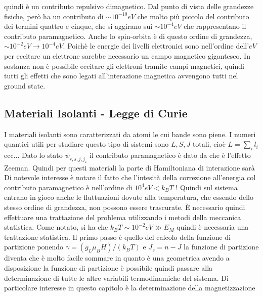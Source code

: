 quindi è un contributo repulsivo dimagnetico. Dal punto di vista delle grandezze fisiche, però ha un contributo di $\sim 10^{-10}eV$ che molto più piccolo del contributo dei termini quattro e cinque, che si aggirano sui $\sim 10^{-4}eV$ che rappresentano il contributo paramagnetico. Anche lo spin-orbita è di questo ordine di grandezza, $\sim 10^{-2}eV \to 10^{-4}eV$.
Poichè le energie dei livelli elettronici sono nell'ordine dell'$eV$ per eccitare un elettrone sarebbe necessario un campo magnetico gigantesco. In sostanza non è possibile eccitare gli elettroni tramite campi magnetici, quindi tutti gli effetti che sono legati all'interazione magnetica avvengono tutti nel ground state.
\subsection{Materiali Isolanti - Legge di Curie}
I materiali isolanti sono caratterizzati da atomi le cui bande sono piene. I numeri quantici utili per studiare questo tipo di sistemi sono $L,S,J$ totali, cioè $L=\sum_i l_i$ ecc... Dato lo stato $\psi_{r,s,j,j_z}$ il contributo paramagnetico è dato da
che è l'effetto Zeeman. Quindi per questi materiali la parte di Hamiltoniana di interazione sarà
Di notevole interesse è notare il fatto che l'intesità della correzione all'energia col contributo paramagnetico è nell'ordine di $10^4eV <k_BT$ ! Quindi sul sistema entrano in gioco anche le fluttuazioni dovute alla temperatura, che essendo dello stesso ordine di grandezza, non possono essere trascurate. \`E necessario quindi effettuare una trattazione del problema utilizzando i metodi della meccanica statistica. Come notato, si ha che $k_BT\sim10^{-2}eV \gg E_M$ quindi è necessaria una trattazione statistica. Il primo passo è quello del calcolo della funzione di partizione
ponendo $\gamma = (g_L \mu_B H) / (k_B T)$ e $J_z = n-J$ la funzione di partizione diventa
che è molto facile sommare in quanto è una geometrica 
avendo a disposizione la funzione di partizione è possibile quindi passare alla determinazione di tutte le altre variabili termodinamiche del sistema. Di particolare interesse in questo capitolo è la determinazione della magnetizzazione
